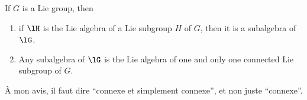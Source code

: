 \begin{theorem}		\label{ThoSubGpSubAlg}		\label{tho:gp_alg}
	If $G$ is a Lie group, then
	\begin{enumerate}
		\item\label{ThoSubGpSubAlgi} if $\lH$ is the Lie algebra of a Lie subgroup $H$ of $G$, then it is a subalgebra of $\lG$,
		\item Any subalgebra of $\lG$ is the Lie algebra of one and only one connected Lie subgroup of $G$.
	\end{enumerate}

	\begin{probleme}
		À mon avis, il faut dire ``connexe et simplement connexe'', et non juste ``connexe''.
	\end{probleme}

\end{theorem}
